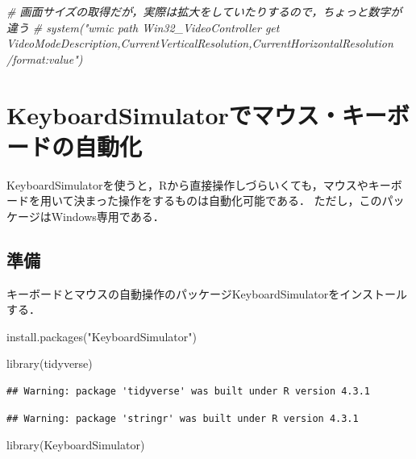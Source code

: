 \documentclass[
]{article}
\newenvironment{Shaded}{\begin{snugshade}}{\end{snugshade}}
\newcommand{\CommentTok}[1]{\textcolor[rgb]{0.56,0.35,0.01}{\textit{#1}}}
\newcommand{\FunctionTok}[1]{\textcolor[rgb]{0.00,0.00,0.00}{#1}}
\newcommand{\NormalTok}[1]{#1}
\newcommand{\StringTok}[1]{\textcolor[rgb]{0.31,0.60,0.02}{#1}}
\begin{document}
\begin{Shaded}
\begin{Highlighting}[]
  \CommentTok{\# 画面サイズの取得だが，実際は拡大をしていたりするので，ちょっと数字が違う}
  \CommentTok{\# system("wmic path Win32\_VideoController get VideoModeDescription,CurrentVerticalResolution,CurrentHorizontalResolution /format:value")}
\end{Highlighting}
\end{Shaded}

\hypertarget{keyboardsimulator}{%
\section{KeyboardSimulatorでマウス・キーボードの自動化}\label{keyboardsimulator}}

KeyboardSimulatorを使うと，Rから直接操作しづらいくても，マウスやキーボードを用いて決まった操作をするものは自動化可能である．
ただし，このパッケージはWindows専用である．

\hypertarget{ux6e96ux5099-8}{%
\subsection{準備}\label{ux6e96ux5099-8}}

キーボードとマウスの自動操作のパッケージKeyboardSimulatorをインストールする．

\begin{Shaded}
\begin{Highlighting}[]
\FunctionTok{install.packages}\NormalTok{(}\StringTok{"KeyboardSimulator"}\NormalTok{)}
\end{Highlighting}
\end{Shaded}

\begin{Shaded}
\begin{Highlighting}[]
\FunctionTok{library}\NormalTok{(tidyverse)}
\end{Highlighting}
\end{Shaded}

\begin{verbatim}
## Warning: package 'tidyverse' was built under R version 4.3.1
\end{verbatim}

\begin{verbatim}
## Warning: package 'stringr' was built under R version 4.3.1
\end{verbatim}

\begin{Shaded}
\begin{Highlighting}[]
\FunctionTok{library}\NormalTok{(KeyboardSimulator)}
\end{Highlighting}
\end{Shaded}
\end{document}
